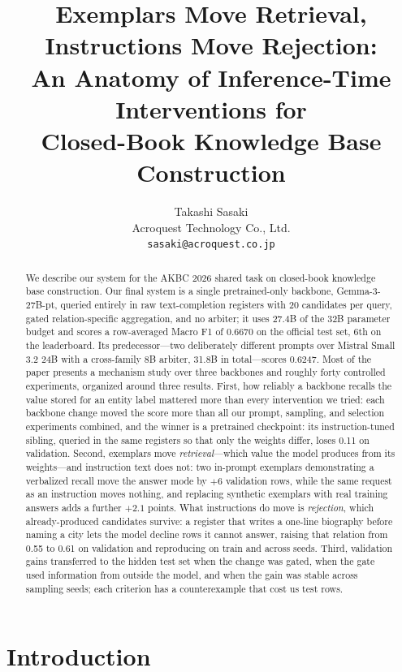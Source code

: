 \documentclass[11pt]{article}
\title{Exemplars Move Retrieval, Instructions Move Rejection:\\
An Anatomy of Inference-Time Interventions for\\
Closed-Book Knowledge Base Construction}
\author{Takashi Sasaki \\
  Acroquest Technology Co., Ltd. \\
  \texttt{sasaki@acroquest.co.jp}}
\begin{document}
\maketitle

\begin{abstract}
We describe our system for the AKBC 2026 shared task on closed-book
knowledge base construction. Our final system is a single pretrained-only
backbone, Gemma-3-27B-pt, queried entirely in raw text-completion
registers with 20 candidates per query, gated relation-specific
aggregation, and no arbiter; it uses 27.4B of the 32B parameter budget
and scores a row-averaged Macro F1 of 0.6670 on the official test set,
6th on the leaderboard. Its
predecessor---two deliberately different prompts over Mistral Small 3.2
24B with a cross-family 8B arbiter, 31.8B in total---scores 0.6247. Most
of the paper presents a mechanism study over three backbones and roughly
forty controlled experiments, organized around three results. First, how
reliably a backbone recalls the value stored for an entity label
mattered more than every intervention we tried: each backbone change moved the
score more than all our prompt, sampling, and selection experiments
combined, and the winner is a pretrained checkpoint: its
instruction-tuned sibling, queried in the same registers so that only the
weights differ, loses 0.11 on validation. Second,
exemplars move \emph{retrieval}---which value the model produces from its
weights---and instruction text does not: two in-prompt exemplars
demonstrating a verbalized recall move the answer mode by $+6$ validation
rows, while the same request as an instruction moves nothing, and
replacing synthetic exemplars with real training answers adds a further
$+2.1$ points. What instructions do move is \emph{rejection}, which
already-produced candidates survive: a register that writes a one-line
biography before naming a city lets the model decline rows it cannot
answer, raising that relation from 0.55 to 0.61 on validation and
reproducing on train and across seeds. Third,
validation gains transferred to the hidden test set when the change was
gated, when the gate used information from outside the model, and
when the gain was stable across sampling seeds; each criterion has a
counterexample that cost us test rows.
\end{abstract}

\section{Introduction}
\end{document}
